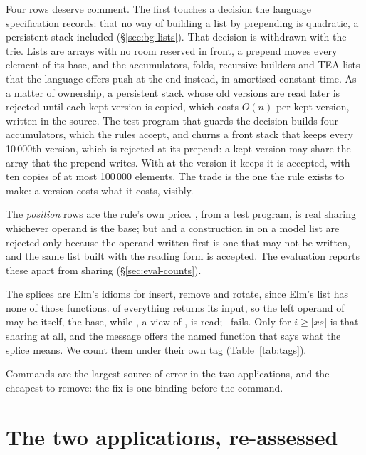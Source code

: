 Four rows deserve comment. The first touches a decision the language specification records: that no way
of building a list by prepending is quadratic, a persistent stack included (\S\ref{sec:bg-lists}). That
decision is withdrawn with the trie. Lists are arrays with no room reserved in front, a prepend moves every
element of its base, and the accumulators, folds, recursive builders and TEA lists that the language
offers push at the end instead, in amortised constant time. As a matter of ownership, a persistent stack
whose old versions are read later is rejected until each kept version is copied, which costs $O(n)$ per
kept version, written in the source. The test program that guards the decision builds four accumulators,
which the rules accept, and churns a front stack that keeps every 10\,000th version, which is rejected at
its prepend: a kept version may share the array that the prepend writes. With
 at the version it keeps it is accepted, with ten copies of at most 100\,000 elements. The
trade is the one the rule exists to make: a version costs what it costs, visibly.

The \emph{position} rows are the rule's own price. , from a test program, is real
sharing whichever operand is the base; but \code{[ x, …defaults ]} and a construction in  on a
model list are rejected only because the operand written first is one that may not be written, and the
same list built with the reading form is accepted. The evaluation reports these apart from sharing
(\S\ref{sec:eval-counts}).

The splices are Elm's idioms for insert, remove and rotate, since Elm's list has none of those functions.
 of everything returns its input, so the left operand of  may be
 itself, the base, while , a view of , is read; \Disjoint\ fails.
Only for $i \ge |\mathit{xs}|$ is that sharing at all, and the message offers the named function that says
what the splice means. We count them under their own tag (Table~\ref{tab:tags}).

Commands are the largest source of error in the two applications, and the cheapest to remove: the fix is
one binding before the command.

\section{The two applications, re-assessed}
\label{sec:disc-apps}

